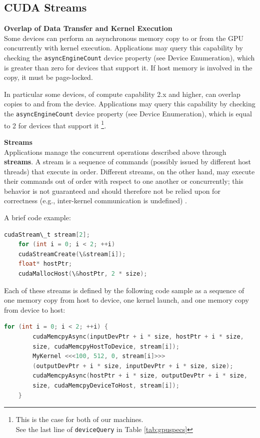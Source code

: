 	

	\subsection{CUDA Streams}
	\label{subs:streams} 
	\textbf{Overlap of Data Transfer and Kernel Execution}\\
	Some devices can perform an asynchronous memory copy to or from the GPU
	concurrently with kernel execution. Applications may query this capability by checking
	the \texttt{asyncEngineCount} device property (see Device Enumeration), which is greater
	than zero for devices that support it. If host memory is involved in the copy, it must be
	page-locked.
	
	In particular some devices, of compute capability 2.x and higher, can overlap copies to and from the
	device. Applications may query this capability by checking the \texttt{asyncEngineCount}
	device property (see Device Enumeration), which is equal to 2 for devices that support
	it \footnote{This is the case for both of our machines. \\ See the last line of \texttt{deviceQuery} in Table \ref{tab:gpuspecs}}. 
	
	\textbf{Streams}\\
	Applications manage the concurrent operations described above through \textbf{streams}. A
	stream is a sequence of commands (possibly issued by different host threads) that	execute in order. Different streams, on the other hand, may execute their commands out of order with respect to one another or concurrently; this behavior is not guaranteed and	should therefore not be relied upon for correctness (e.g., inter-kernel communication is undefined) \cite{cudaguide}.
	
	A brief code example:
	\begin{lstlisting}[language=c++]
	cudaStream\_t stream[2];
	for (int i = 0; i < 2; ++i)
	cudaStreamCreate(\&stream[i]);
	float* hostPtr;
	cudaMallocHost(\&hostPtr, 2 * size);
	\end{lstlisting}

	Each of these streams is defined by the following code sample as a sequence of one
	memory copy from host to device, one kernel launch, and one memory copy from device
	to host:
	\begin{lstlisting}[language=C++]
	for (int i = 0; i < 2; ++i) {
		cudaMemcpyAsync(inputDevPtr + i * size, hostPtr + i * size,
		size, cudaMemcpyHostToDevice, stream[i]);
		MyKernel <<<100, 512, 0, stream[i]>>>
		(outputDevPtr + i * size, inputDevPtr + i * size, size);
		cudaMemcpyAsync(hostPtr + i * size, outputDevPtr + i * size,
		size, cudaMemcpyDeviceToHost, stream[i]);
	}
	\end{lstlisting}
	
